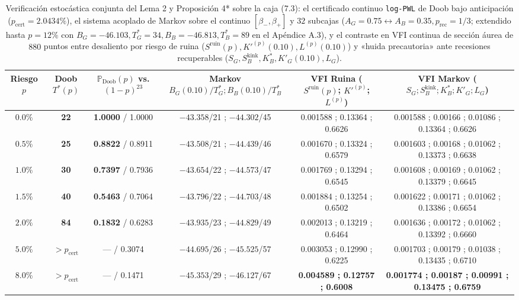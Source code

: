 \documentclass[11pt,letterpaper]{article}
\theoremstyle{plain}
\begin{document}
\begin{table}[htbp]
\centering
\scriptsize
\setlength{\tabcolsep}{2.6pt}
\begin{tabular}{@{}cccccc@{}}
\toprule
Riesgo $p$ & Doob $T^*(p)$ & $\mathbb{P}_{\mathrm{Doob}}(p)$ vs. $(1-p)^{23}$ & Markov $B_G(0.10)/T^*_G ; B_B(0.10)/T^*_B$ & VFI Ruina ($S^{\mathrm{ruin}}(p)$; $K'^{(p)}$; $L^{(p)}$) & VFI Markov ($S_G; S_B^{\mathrm{kink}}; K_B^*; K'_G; L_G$)\\
\midrule
$0.0\%$ & \textbf{22} & \textbf{1.0000} / 1.0000 & $-43.358$/21 ; $-44.302$/45 & 0.001588 ; 0.13364 ; 0.6626 & 0.001588 ; 0.00166 ; 0.01086 ; 0.13364 ; 0.6626\\
$0.5\%$ & \textbf{25} & \textbf{0.8822} / 0.8911 & $-43.508$/21 ; $-44.439$/46 & 0.001670 ; 0.13324 ; 0.6579 & 0.001603 ; 0.00168 ; 0.01062 ; 0.13373 ; 0.6638\\
$1.0\%$ & \textbf{30} & \textbf{0.7397} / 0.7936 & $-43.654$/22 ; $-44.573$/47 & 0.001769 ; 0.13294 ; 0.6545 & 0.001608 ; 0.00169 ; 0.01062 ; 0.13379 ; 0.6645\\
$1.5\%$ & \textbf{40} & \textbf{0.5463} / 0.7064 & $-43.796$/22 ; $-44.703$/48 & 0.001884 ; 0.13254 ; 0.6502 & 0.001622 ; 0.00171 ; 0.01062 ; 0.13386 ; 0.6654\\
$2.0\%$ & \textbf{84} & \textbf{0.1832} / 0.6283 & $-43.935$/23 ; $-44.829$/49 & 0.002013 ; 0.13219 ; 0.6464 & 0.001636 ; 0.00172 ; 0.01062 ; 0.13392 ; 0.6660\\
$5.0\%$ & $>p_{\mathrm{cert}}$ & --- / 0.3074 & $-44.695$/26 ; $-45.525$/57 & 0.003053 ; 0.12990 ; 0.6225 & 0.001703 ; 0.00179 ; 0.01038 ; 0.13435 ; 0.6710\\
$8.0\%$ & $>p_{\mathrm{cert}}$ & --- / 0.1471 & $-45.353$/29 ; $-46.127$/67 & \textbf{0.004589 ; 0.12757 ; 0.6008} & \textbf{0.001774 ; 0.00187 ; 0.00991 ; 0.13475 ; 0.6759}\\
\bottomrule
\end{tabular}
\caption{Verificación estocástica conjunta del Lema 2 y Proposición 4* sobre la caja (7.3): el certificado continuo \texttt{log-PWL} de Doob bajo anticipación ($p_{\mathrm{cert}}=2.0434\%$), el sistema acoplado de Markov sobre el continuo $[\beta_-,\beta_+]$ y $32$ subcajas ($A_G=0.75\leftrightarrow A_B=0.35, p_{\mathrm{rec}}=1/3$; extendido hasta $p=12\%$ con $B_G=-46.103, T^*_G=34, B_B=-46.813, T^*_B=89$ en el Apéndice A.3), y el contraste en VFI continua de sección áurea de $880$ puntos entre desaliento por riesgo de ruina ($S^{\mathrm{ruin}}(p), K'^{(p)}(0.10), L^{(p)}(0.10)$) y «huida precautoria» ante recesiones recuperables ($S_G, S_B^{\mathrm{kink}}, K_B^*, K'_G(0.10), L_G$).}
\end{table}
\end{document}

